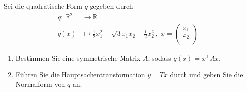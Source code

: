 \newpage

\subsubsection{} %

Sei die quadratische Form \( q \) gegeben durch \[ \begin{aligned} q: \; \mathbb{R}^2 &\rightarrow \mathbb{R} \\ q(x) &\mapsto \frac{1}{2}x_1^2 + \sqrt{3}x_1x_2-\frac{1}{2}x_2^2 \;, \;x= \begin{pmatrix} x_1 \\ x_2\\ \end{pmatrix} \end{aligned} \]

\begin{enumerate}[label=\alph*)]
    \item Bestimmen Sie eine symmetrische Matrix \( A \), sodass \( q(x)=x^\top Ax \).
    \item Führen Sie die Hauptsachentransformation \( y=Tx \) durch und geben Sie die Normalform von \( q \) an.
\end{enumerate}

\vspace{1\baselineskip}

